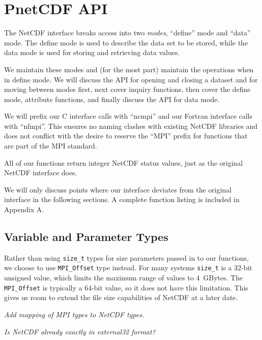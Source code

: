 \documentclass[10pt]{article}
\begin{document}

\section{PnetCDF API}

The NetCDF interface breaks access into two \emph{modes}, ``define'' mode and
``data'' mode.  The define mode is used to describe the data set to be stored,
while the data mode is used for storing and retrieving data values.

We maintain these modes and (for the most part) maintain the operations when
in define mode.  We will discuss the API for opening and closing a dataset and
for moving between modes first, next cover inquiry functions, then cover the
define mode, attribute functions, and finally discuss the API for data mode.

%
%
We will prefix our C interface calls with ``ncmpi'' and our Fortran interface
calls with ``nfmpi''.  This ensures no naming clashes with existing NetCDF
libraries and does not conflict with the desire to reserve the ``MPI'' prefix
for functions that are part of the MPI standard.

All of our functions return integer NetCDF status values, just as the original
NetCDF interface does.

We will only discuss points where our interface deviates from the original
interface in the following sections. A complete function listing is included
in Appendix A.

\subsection{Variable and Parameter Types}

%
%
Rather than using \texttt{size\_t} types for size parameters passed in to our
functions, we choose to use \texttt{MPI\_Offset} type instead.  For many
systems \texttt{size\_t} is a 32-bit unsigned value, which limits the maximum
range of values to 4~GBytes.  The \texttt{MPI\_Offset} is typically a 64-bit
value, so it does not have this limitation.  This gives us room to extend the
file size capabilities of NetCDF at a later date.

\emph{Add mapping of MPI types to NetCDF types.}

\emph{Is NetCDF already exactly in external32 format?}
\end{document}

